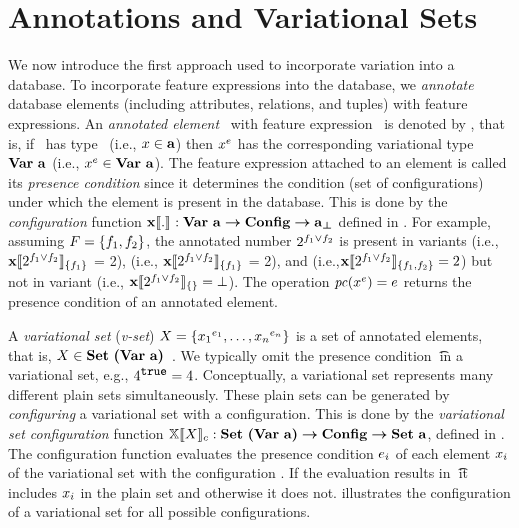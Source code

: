 \section{Annotations and Variational Sets}
\label{sec:vset}


We now introduce the first approach used to incorporate variation into a database.
To incorporate feature expressions into the database,
we \emph{annotate} database elements (including attributes, relations, and tuples) 
with feature expressions. An \emph{annotated element} \elem\ with feature expression \dimMeta\
is denoted by \annot \elem, 
that is, if \elem\ has type \typevar\ (i.e., $\elem \in \typevar$)
then $\annot \elem$ has the corresponding variational type 
$\vartype \typevar$ (i.e., $\annot \elem \in \vartype \typevar$).
%
The feature expression attached to an element is called its \emph{presence
condition} since it determines the condition (set of configurations) under
which the element is present in the database. 
This is done by the \emph{configuration} function $\xeSem [] . : \elemSet \totype \confSet \totype \maybe {\pelemSet}$ defined in .
For example, assuming
$\features=\set{\A,\B}$, the annotated number $\annot [\A \vee \B] 2$ is present
in variants \setDef{\A} (i.e., $\xeSem [\setDef{\A}] {\annot [\A \vee \B] 2}$ = 2), 
\setDef{\B} (i.e., $\xeSem [\setDef{\A}] {\annot [\A \vee \B] 2}$ = 2), 
and \setDef{\A,\B} (i.e.,$\xeSem [\setDef{\A, \B}] {\annot [\A \vee \B] 2} = 2$) 
but not in variant
\setDef{} (i.e., $\xeSem [\setDef { }] {\annot [\A \vee \B] 2} = \bot$). 
%
The operation $\getPC{\annot{\elem}}=e$ returns the presence condition of an
annotated element.



A \emph{variational set} (\emph{v-set}) $\vset = \setDef {\annot [\dimMeta_1] {\elem_1},\ldots, \annot [\dimMeta_n] {\elem_n}}$ 
is a set of annotated elements, 
that is,
$\vset \in \vsetSet$~\cite{EWC13fosd,Walk14onward,ATW17dbpl}.
We typically omit the presence condition \t\ in a variational set,
e.g., $\annot [\t] 4 = 4$.
%
Conceptually, a variational set represents many different plain sets simultaneously.
These plain sets can be generated by \emph{configuring} a variational set with a configuration.
This is done by the \emph{variational set configuration} function
\ensuremath{\osetSem \vset: \vsetSet \totype \confSet \totype \psetSet}, defined in .
The configuration function evaluates the presence condition $\dimMeta_i$ of each 
element $\elem_i$ of the variational set with the configuration \config. 
If the evaluation results in \t\ it includes $\elem_i$ in the plain set and otherwise it
does not. \exref{vset-conf} illustrates the configuration of a variational set for all
possible configurations. 

